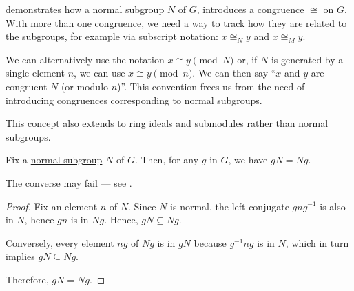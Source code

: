 \begin{remark}\label{rem:congruence_modulo_substructure}
   demonstrates how a \hyperref[def:normal_subgroup]{normal subgroup} \( N \) of \( G \), introduces a congruence \( \cong \) on \( G \). With more than one congruence, we need a way to track how they are related to the subgroups, for example via subscript notation: \( x \cong_N y \) and \( x \cong_M y \).

  We can alternatively use the notation \( x \cong y \pmod N \) or, if \( N \) is generated by a single element \( n \), we can use \( x \cong y \pmod n \). We can then say \enquote{\( x \) and \( y \) are congruent  \( N \) (or modulo \( n \))}. This convention frees us from the need of introducing congruences corresponding to normal subgroups.

  This concept also extends to \hyperref[def:semiring_ideal]{ring ideals} and  \hyperref[def:module/submodel]{submodules} rather than normal subgroups.
\end{remark}

\begin{proposition}\label{thm:normal_subgroup_left_right_cosets}
  Fix a \hyperref[def:normal_subgroup]{normal subgroup} \( N \) of \( G \). Then, for any \( g \) in \( G \), we have \( gN = Ng \).
\end{proposition}
\begin{comments}
  \item The converse may fail --- see .
\end{comments}
\begin{proof}
  Fix an element \( n \) of \( N \). Since \( N \) is normal, the left conjugate \( gng^{-1} \) is also in \( N \), hence \( gn \) is in \( Ng \). Hence, \( gN \subseteq Ng \).

  Conversely, every element \( ng \) of \( Ng \) is in \( gN \) because \( g^{-1} n g \) is in \( N \), which in turn implies \( gN \subseteq Ng \).

  Therefore, \( gN = Ng \).
\end{proof}

